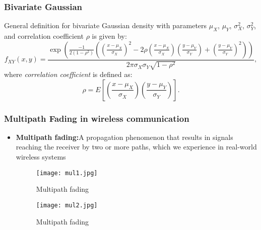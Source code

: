 \documentclass{beamer}
\begin{document}
\frame
{
  \frametitle{Bivariate Gaussian}

General definition for bivariate
Gaussian density with parameters $\mu_X$, $\mu_Y$, $\sigma_X^2$,
$\sigma_Y^2$, and correlation coefficient $\rho$ is given by:
\begin{equation}
f_{XY}(x,y)=\frac{\exp\left(\frac{-1}{2(1-\rho^2)}\left(\left(\frac{x-\mu_X}{\sigma_X}\right)^2-2\rho\left(\frac{x-\mu_X}{\sigma_X}\right)\left(\frac{y-\mu_Y}{\sigma_Y}\right)+\left(\frac{y-\mu_Y}{\sigma_Y}\right)^2\right)\right)}{2\pi\sigma_X\sigma_Y\sqrt{1-\rho^2}},
\end{equation}
where {\it correlation coefficient} is defined as:
\begin{equation}
    \rho=E\left[\left(\frac{x-\mu_X}{\sigma_X}\right)\left(\frac{y-\mu_Y}{\sigma_Y}\right)\right].
\end{equation}
}
  

\frame
{
  \frametitle{Multipath Fading in wireless communication}
  \begin{itemize}
      \item \textbf{Multipath fading:}A propagation phenomenon that results in signals reaching the receiver by two or more paths, which we experience in real-world wireless systems
      \begin{figure}
       \centering
       \texttt{[image: mul1.jpg]}
       \caption{Multipath fading}
       \label{multipath}
       \end{figure}
       
       \begin{figure}
       \centering
       \texttt{[image: mul2.jpg]}
       \caption{Multipath fading}
       \label{multipath}
       \end{figure}
  \end{itemize}
}
  
\end{document}
